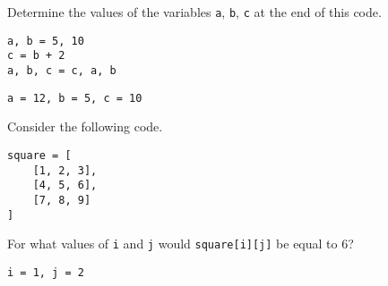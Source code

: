 \documentclass[12pt]{exam}
\begin{document}
\begin{questions}


\question Determine the values of the variables \verb|a|, \verb|b|, \verb|c| at the end of this code. 
\begin{verbatim}
a, b = 5, 10
c = b + 2
a, b, c = c, a, b
\end{verbatim}

\begin{solution}
\verb|a = 12, b = 5, c = 10|
\end{solution}
\vfill

\newpage
\question Consider the following code.
\begin{verbatim}
square = [
    [1, 2, 3], 
    [4, 5, 6], 
    [7, 8, 9]
]
\end{verbatim}
\begin{parts}
\item For what values of \verb|i| and \verb|j| would \verb|square[i][j]| be equal to 6? 
\begin{solution}
\verb|i = 1, j = 2|
\end{solution}
\bigskip
\bigskip


\end{parts}
\end{questions}
\end{document}
